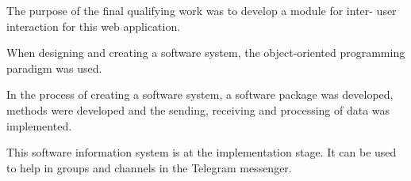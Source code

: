 The purpose of the final qualifying work was to develop a module for inter- user interaction for this web application.

When designing and creating a software system, the object-oriented programming paradigm was used.

In the process of creating a software system, a software package was developed, methods were developed and the sending, receiving and processing of data was implemented.

This software information system is at the implementation stage. It can be used to help in groups and channels in the Telegram messenger.

